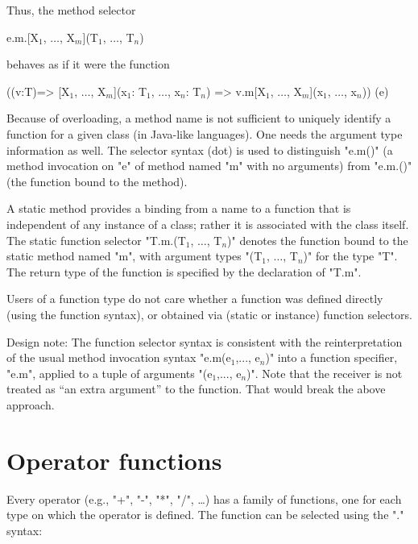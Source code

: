 Thus, the method selector

\begin{xtenmath}
e.m.[X$_1$, $\dots$, X$_m$](T$_1$, $\dots$, T$_n$)
\end{xtenmath}
\noindent behaves as if it were the function
\begin{xtenmath}
((v:T)=>
  [X$_1$, $\dots$, X$_m$](x$_1$: T$_1$, $\dots$, x$_n$: T$_n$) => v.m[X$_1$, $\dots$, X$_m$](x$_1$, $\dots$, x$_n$))
(e)
\end{xtenmath}

\begin{note}
Because of overloading, a method name is not sufficient to
uniquely identify a function for a given class (in Java-like languages).
One needs the argument type information as well.
The selector syntax (dot) is used to distinguish \xcd"e.m()" (a
method invocation on \xcd"e" of method named \xcd"m" with no arguments)
from \xcd"e.m.()"
(the function bound to the method). 
\end{note}

A static method provides a binding from a name to a function that is
independent of any instance of a class; rather it is associated with the
class itself. The static function selector
\xcdmath"T.m.(T$_1$, $\dots$, T$_n$)" denotes the
function bound to the static method named \xcd"m", with argument types
\xcdmath"(T$_1$, $\dots$, T$_n$)" for the type \xcd"T". The return type
of the function is specified by the declaration of \xcd"T.m".

Users of a function type do not care whether a function was defined
directly (using the function syntax), or obtained via (static or
instance) function selectors.

\begin{note}
Design note: The function selector syntax is consistent with the
reinterpretation of the usual method invocation syntax
\xcdmath"e.m(e$_1$,..., e$_n$)"
into a function specifier, \xcd"e.m", applied to a tuple of arguments
\xcdmath"(e$_1$,..., e$_n$)". Note that the receiver is not
treated as ``an extra argument'' to the
function. That would break the above approach.
\end{note}

\section{Operator functions}
\label{OperatorFunction}
Every operator (e.g.,
\xcd"+",
\xcd"-",
\xcd"*",
\xcd"/",
\dots) has a family of functions, one for
each type on which the operator is defined. The function can be
selected using the "." syntax:

